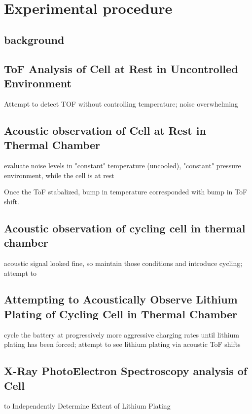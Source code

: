 \chapter{Experimental procedure}
\section{background}

\section{ToF Analysis of Cell at Rest in Uncontrolled Environment}

Attempt to detect TOF without controlling temperature; noise overwhelming
    
    
\section{Acoustic observation of Cell at Rest in Thermal Chamber}

    evaluate noise levels in "constant" temperature (uncooled), "constant" pressure environment, while the cell is at rest
    
    Once the ToF stabalized, bump in temperature corresponded with bump in ToF shift.

    
\section{Acoustic observation of cycling cell in thermal chamber}
    acoustic signal looked fine, so maintain those conditions and introduce cycling; attempt to 
    
    
\section{Attempting to Acoustically Observe Lithium Plating of Cycling Cell in Thermal Chamber}
    cycle the battery at progressively more aggressive charging rates until lithium plating has been forced; attempt to see lithium plating via acoustic ToF shifts
    
\section{X-Ray PhotoElectron Spectroscopy analysis of Cell}
    to Independently Determine Extent of Lithium Plating
